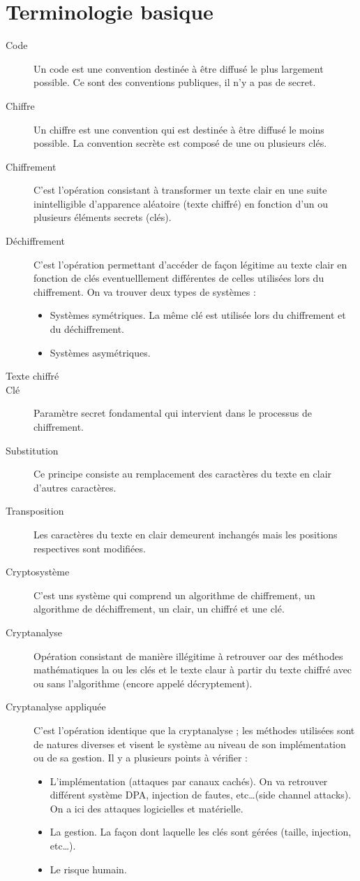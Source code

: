 \section{Terminologie basique}
\begin{description}
 \item[Code] Un code est une convention destinée à être diffusé le plus largement possible. Ce sont des conventions publiques, il n'y a pas de secret.
 \item[Chiffre] Un chiffre est une convention qui est destinée à être diffusé le moins possible. La convention secrète est composé de une ou plusieurs clés.
 \item[Chiffrement] C'est l'opération consistant à transformer un texte clair en une suite inintelligible d'apparence aléatoire (texte chiffré) en fonction d'un ou plusieurs éléments secrets (clés).
 \item[Déchiffrement] C'est l'opération permettant d'accéder de façon légitime au texte clair en fonction de clés eventuelllement différentes de celles utilisées lors du chiffrement. On va trouver deux types de systèmes :
    \begin{itemize}
     \item Systèmes symétriques. La même clé est utilisée lors du chiffrement et du déchiffrement.
     \item Systèmes asymétriques.
    \end{itemize}
 \item[Texte chiffré] 
 \item[Clé] Paramètre secret fondamental qui intervient dans le processus de chiffrement.
 \item[Substitution] Ce principe consiste au remplacement des caractères du texte en clair d'autres caractères.
 \item[Transposition] Les caractères du texte en clair demeurent inchangés mais les positions respectives sont modifiées.
 \item[Cryptosystème] C'est uns système qui comprend un algorithme de chiffrement, un algorithme de déchiffrement, un clair, un chiffré et une clé.
 \item[Cryptanalyse] Opération consistant de manière illégitime à retrouver oar des méthodes mathématiques la ou les clés et le texte claur à partir du texte chiffré avec ou sans l'algorithme (encore appelé décryptement).
 \item[Cryptanalyse appliquée] C'est l'opération identique que la cryptanalyse ; les méthodes utilisées sont de natures diverses et visent le système au niveau de son implémentation ou de sa gestion. Il y a plusieurs points à vérifier :
    \begin{itemize}
     \item L'implémentation (attaques par canaux cachés). On va retrouver différent système DPA, injection de fautes, etc\ldots (side channel attacks). On a ici des attaques logicielles et matérielle.
     \item La gestion. La façon dont laquelle les clés sont gérées (taille, injection, etc\ldots).
     \item Le risque humain.
    \end{itemize}


\end{description}
